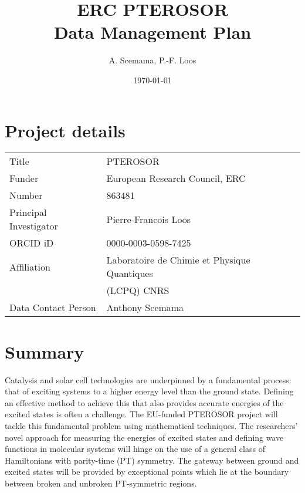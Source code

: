 \documentclass[12pt,onecolumn,notitlepage]{revtex4-1}
\begin{document}
\author{A. Scemama, P.-F. Loos}
\date{\today}
\title{ERC PTEROSOR\\\medskip
\large Data Management Plan}

\maketitle

\section{Project details}
\label{sec:org2420f0d}

\begin{center}
\begin{tabular}{ll}
\hline
Title                  & PTEROSOR\\
Funder                 & European Research Council, ERC\\
Number                 & 863481\\
Principal Investigator & Pierre-Francois Loos\\
ORCID iD               & 0000-0003-0598-7425\\
Affiliation            & Laboratoire de Chimie et Physique Quantiques\\
                       & (LCPQ) CNRS\\
Data Contact Person    & Anthony Scemama\\
\hline
\end{tabular}
\end{center}

\section{Summary}

Catalysis and solar cell technologies are underpinned by a fundamental
process: that of exciting systems to a higher energy level than the
ground state. Defining an effective method to achieve this that also
provides accurate energies of the excited states is often a
challenge. The EU-funded PTEROSOR project will tackle this fundamental
problem using mathematical techniques. The researchers' novel approach
for measuring the energies of excited states and defining wave
functions in molecular systems will hinge on the use of a general
class of Hamiltonians with parity-time (PT) symmetry. The gateway
between ground and excited states will be provided by exceptional
points which lie at the boundary between broken and unbroken
PT-symmetric regions.
\end{document}
